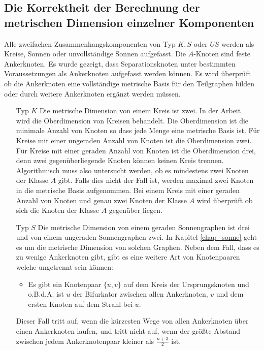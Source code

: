 \subsection{Die Korrektheit der Berechnung der metrischen Dimension einzelner Komponenten}
\label{korrkomp}\vspace{-3mm}
Alle zweifachen Zusammenhangskomponenten von Typ $K,S$ oder $US$ werden als Kreise, Sonnen oder unvollständige Sonnen aufgefasst. Die $A$-Knoten sind feste Ankerknoten. Es wurde gezeigt, dass Separationsknoten unter bestimmten Voraussetzungen als Ankerknoten aufgefasst werden können. Es wird überprüft ob die Ankerknoten eine vollständige metrische Basis für den Teilgraphen bilden oder durch weitere Ankerknoten ergänzt werden müssen.
\begin{itemize}
\item[Typ $K$]
Die metrische Dimension von einem Kreis ist zwei. In der Arbeit \grqq$\;$\cite{upper} wird die Oberdimension von Kreisen behandelt. Die Oberdimension ist die minimale Anzahl von Knoten so dass jede Menge eine metrische Basis ist.\newline
Für Kreise mit einer ungeraden Anzahl von Knoten ist die Oberdimension zwei.\newline
Für Kreise mit einer geraden Anzahl von Knoten ist die Oberdimension drei, denn zwei gegenüberliegende Knoten können keinen Kreis trennen. Algorithmisch muss also untersucht werden, ob es mindestens zwei Knoten der Klasse $A$ gibt. Falls dies nicht der Fall ist, werden maximal zwei Knoten in die metrische Basis aufgenommen. Bei einem Kreis mit einer geraden Anzahl von Knoten und genau zwei Knoten der Klasse $A$ wird überprüft ob sich die Knoten der Klasse $A$ gegenüber liegen.
\item[Typ $S$]
Die metrische Dimension von einem geraden Sonnengraphen ist drei und von einem ungeraden Sonnengraphen zwei.
In Kapitel \ref{chap_sonne} geht es um die metrische Dimension von solchen Graphen. Neben dem Fall, dass es zu wenige Ankerknoten gibt, gibt es eine weitere Art von Knotenpaaren welche ungetrennt sein können:
\begin{itemize}
\item Es gibt ein Knotenpaar $\{u,v\}$ auf dem Kreis der Ursprungsknoten und o.B.d.A. ist $u$ der Bifurkator zwischen allen Ankerknoten, $v$ und dem ersten Knoten auf dem Strahl bei $u$.
\end{itemize}
Dieser Fall tritt auf, wenn die kürzesten Wege von allen Ankerknoten über einen Ankerknoten laufen, und tritt nicht auf, wenn der größte Abstand zwischen jedem Ankerknotenpaar kleiner als $\frac{n+3}{2}$ ist. 

\end{itemize}
